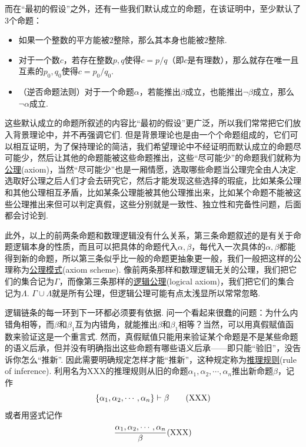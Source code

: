而在“最初的假设”之外，还有一些我们默认成立的命题，在该证明中，至少默认了3个命题：
\begin{itemize}
    \item 如果一个整数的平方能被\(2\)整除，那么其本身也能被\(2\)整除.
    \item 对于一个数\(c\)，若存在整数\(p,q\)使得\(c=p/q\)（即\(c\)是有理数），那么就存在唯一且互素的\(p_0,q_0\)使得\(c=p_0/q_0\).
    \item （逆否命题法则）对于一个命题\(\alpha\)，若能推出\(\beta\)成立，也能推出\(\neg\beta\)成立，那么\(\neg \alpha\)成立.
\end{itemize}

这些默认成立的命题所叙述的内容比“最初的假设”更广泛，所以我们常常把它们放入背景理论中，并不再强调它们. 但是背景理论也是由一个个命题组成的，它们可以相互证明，为了保持理论的简洁，我们希望理论中不经证明而默认成立的命题尽可能少，然后让其他的命题能被这些命题推出，这些“尽可能少”的命题我们就称为\underline{公理}(axiom)，当然“尽可能少”也是一厢情愿，选取哪些命题当公理完全由人决定. 选取好公理之后人们才会去研究它，然后才能发现这些选择的瑕疵，比如某条公理和其他公理相互矛盾，比如某条公理能被其他公理推出来，比如某个命题不能被这些公理推出来但可以判定真假，这些分别就是一致性、独立性和完备性问题，后面都会讨论到.

此外，以上的前两条命题和数理逻辑没有什么关系，第三条命题叙述的是有关于命题逻辑本身的性质，而且可以把具体的命题代入\(\alpha,\beta\)，每代入一次具体的\(\alpha,\beta\)都能得到新的命题，所以第三条似乎比一般的命题更抽象更一般，我们一般把这样的公理称为\underline{公理模式}(axiom scheme). 像前两条那样和数理逻辑无关的公理，我们把它们的集合记为\(\Gamma\)，而像第三条那样的\underline{逻辑公理}(logical axiom)，我们把它们的集合记为\(\Lambda\). \(\Gamma \cup \Lambda\)就是所有公理，{\small 但逻辑公理可能有点太浅显所以常常忽略.}

逻辑链条的每一环到下一环都必须要有依据. 问一个看起来很蠢的问题：为什么内错角相等，而\(\beta\)和\(\beta_1\)互为内错角，就能推出\(\beta\)和\(\beta_1\)相等？当然，可以用真假赋值函数来验证这是一个重言式. 然而，真假赋值只能用来验证某个命题是不是某些命题的语义后承，但并没有明确指出这些命题有哪些语义后承——即只能“验旧”，没告诉你怎么“推新”. 因此需要明确规定怎样才能“推新”，这种规定称为\underline{推理规则}(rule of inference). 利用名为XXX的推理规则从旧的命题\(\alpha_1, \alpha_2, \cdots, \alpha_n\)推出新命题\(\beta\)，记作
\[\{\alpha_1, \alpha_2, \cdots, \alpha_n\} \vdash \beta \qquad ({\rm XXX})\]
或者用竖式记作
\[{{\alpha_1, \alpha_2, \cdots, \alpha_n} \over {\beta}} ({\rm XXX})\]

